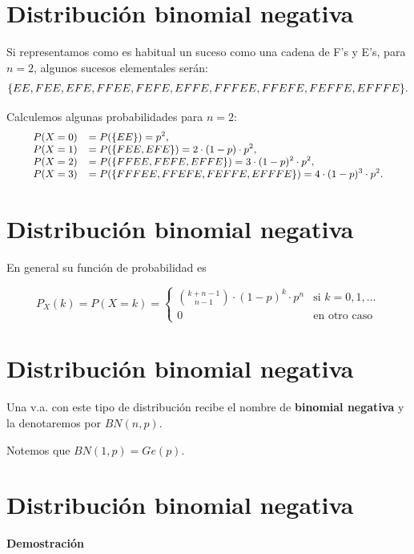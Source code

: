 \documentclass[
  letterpaper,
  DIV=11,
  numbers=noendperiod]{scrreprt}
\begin{document}
\section{Distribución binomial
negativa}\label{distribuciuxf3n-binomial-negativa-2}

Si representamos como es habitual un suceso como una cadena de F's y
E's, para \(n=2\), algunos sucesos elementales serán:
\[\small{\{EE,FEE,EFE, FFEE,FEFE,EFFE,FFFEE,FFEFE,FEFFE,EFFFE\}.}\]

Calculemos algunas probabilidades para \(n=2\): \[
\small{
\begin{array}{rl}
P(X=0) & =P(\{EE\})=p^2, \\
P(X=1) & =P(\{FEE,EFE\})=2\cdot (1-p)\cdot p^2, \\
P(X=2) & =P(\{FFEE,FEFE,EFFE\})=3\cdot (1-p)^2\cdot p^2, \\
P(X=3) & =P(\{FFFEE,FFEFE,FEFFE,EFFFE\})=4\cdot (1-p)^3\cdot p^2.
\end{array}
}
\]

\section{Distribución binomial
negativa}\label{distribuciuxf3n-binomial-negativa-3}

En general su función de probabilidad es

\[
P_{X}(k)=P(X=k)=\left\{\begin{array}{ll}
     {k+n-1\choose n-1} \cdot (1-p)^{k}\cdot p^n & \mbox{si } k=0,1,\ldots\\
     0 & \mbox{en otro caso}\end{array}\right.
\]

\section{Distribución binomial
negativa}\label{distribuciuxf3n-binomial-negativa-4}

Una v.a. con este tipo de distribución recibe el nombre de
\textbf{binomial negativa} y la denotaremos por \(BN(n,p)\).

Notemos que \(BN(1,p)=Ge(p)\).

\section{Distribución binomial
negativa}\label{distribuciuxf3n-binomial-negativa-5}

\textbf{Demostración}
\end{document}
